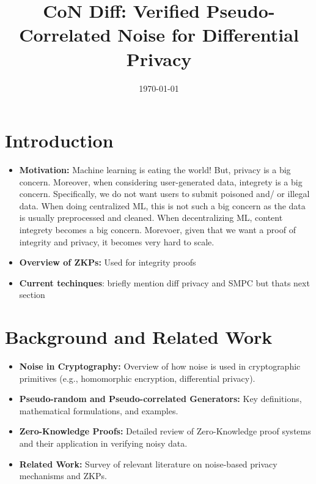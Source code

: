 \documentclass[11pt]{article}
\newcommand{\myname}{Lev Stambler}
\begin{document}
\title{CoN Diff: Verified Pseudo-Correlated Noise for Differential Privacy}


\date{\today}
\maketitle




\section{Introduction}
\begin{itemize}
    \item \textbf{Motivation:} Machine learning is eating the world! But, privacy is a big concern.
	    Moreover, when considering user-generated data, integrety is a big concern.
	    Specifically, we do not want users to submit poisoned and/ or illegal data.
	    When doing centralized ML, this is not such a big concern as the data is usually preprocessed and cleaned.
	    When decentralizing ML, content integrety becomes a big concern.
	    Morevoer, given that we want a proof of integrity and privacy, it becomes very hard to scale.

    \item \textbf{Overview of ZKPs:} Used for integrity proofs
    \item \textbf{Current techinques}: briefly mention diff privacy and SMPC but thats next section
\end{itemize}

\section{Background and Related Work}
\begin{itemize}
    \item \textbf{Noise in Cryptography:} Overview of how noise is used in cryptographic primitives (e.g., homomorphic encryption, differential privacy).
    \item \textbf{Pseudo-random and Pseudo-correlated Generators:} Key definitions, mathematical formulations, and examples.
    \item \textbf{Zero-Knowledge Proofs:} Detailed review of Zero-Knowledge proof systems and their application in verifying noisy data.
    \item \textbf{Related Work:} Survey of relevant literature on noise-based privacy mechanisms and ZKPs.
\end{itemize}
\end{document}

